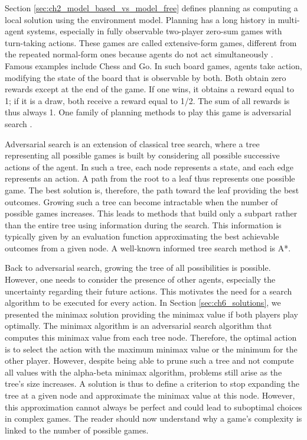 Section \ref{sec:ch2_model_based_vs_model_free} defines planning as computing a local solution using the environment model.
Planning has a long history in multi-agent systems, especially in fully observable two-player zero-sum games with turn-taking actions.
These games are called extensive-form games, different from the repeated normal-form ones because agents do not act simultaneously \citep{Nowe2012GTMARL}.
Famous examples include Chess and Go.
In such board games, agents take action, modifying the state of the board that is observable by both.
Both obtain zero rewards except at the end of the game.
If one wins, it obtains a reward equal to 1; if it is a draw, both receive a reward equal to 1/2.
The sum of all rewards is thus always 1.
One family of planning methods to play this game is adversarial search \citep{russel2010}.

Adversarial search is an extension of classical tree search, where a tree representing all possible games is built by considering all possible successive actions of the agent.
In such a tree, each node represents a state, and each edge represents an action. 
A path from the root to a leaf thus represents one possible game.
The best solution is, therefore, the path toward the leaf providing the best outcomes.
Growing such a tree can become intractable when the number of possible games increases.
This leads to methods that build only a subpart rather than the entire tree using information during the search.
This information is typically given by an evaluation function approximating the best achievable outcomes from a given node.
A well-known informed tree search method is A*.

Back to adversarial search, growing the tree of all possibilities is possible.
However, one needs to consider the presence of other agents, especially the uncertainty regarding their future actions.
This motivates the need for a search algorithm to be executed for every action.
In Section \ref{sec:ch6_solutions}, we presented the minimax solution providing the minimax value if both players play optimally.
The minimax algorithm is an adversarial search algorithm that computes this minimax value from each tree node.
Therefore, the optimal action is to select the action with the maximum minimax value or the minimum for the other player.
However, despite being able to prune such a tree and not compute all values with the alpha-beta minimax algorithm, problems still arise as the tree's size increases.
A solution is thus to define a criterion to stop expanding the tree at a given node and approximate the minimax value at this node.
However, this approximation cannot always be perfect and could lead to suboptimal choices in complex games.
The reader should now understand why a game's complexity is linked to the number of possible games.

